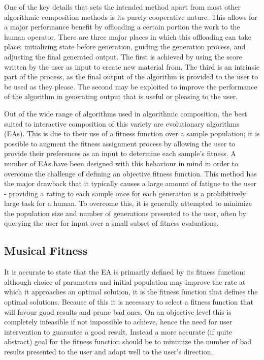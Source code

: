 \documentclass[ author={Stephen Livermore-Tozer},
				supervisor={Dr. Peter Flach},
				degree={MEng},
				title={Performing Algorithmic Co-composition Using Machine Learning},
				subtitle={},
				type={research},
				year={2016} ]{dissertation}
\begin{document}
	One of the key details that sets the intended method apart from most other algorithmic composition methods is its purely cooperative nature. This allows for a major performance benefit by offloading a certain portion the work to the human operator. There are three major places in which this offloading can take place: initializing state before generation, guiding the generation process, and adjusting the final generated output. The first is achieved by using the score written by the user as input to create new material from. The third is an intrinsic part of the process, as the final output of the algorithm is provided to the user to be used as they please. The second may be exploited to improve the performance of the algorithm in generating output that is useful or pleasing to the user.
	
	Out of the wide range of algorithms used in algorithmic composition, the best suited to interactive composition of this variety are evolutionary algorithms (EAs). This is due to their use of a fitness function over a sample population; it is possible to augment the fitness assignment process by allowing the user to provide their preferences as an input to determine each sample's fitness. A number of EAs have been designed with this behaviour in mind in order to overcome the challenge of defining an objective fitness function. This method has the major drawback that it typically causes a large amount of fatigue to the user - providing a rating to each sample once for each generation is a prohibitively large task for a human. To overcome this, it is generally attempted to minimize the population size and number of generations presented to the user, often by querying the user for input over a small subset of fitness evaluations. 
	
	\subsection{Musical Fitness}
	\label{sec:fitness}
	
	It is accurate to state that the EA is primarily defined by its fitness function: although choice of parameters and initial population may improve the rate at which it approaches an optimal solution, it is the fitness function that defines the optimal solutions. Because of this it is necessary to select a fitness function that will favour good results and prune bad ones. On an objective level this is completely infeasible if not impossible to achieve, hence the need for user intervention to guarantee a good result. Instead a more accurate (if quite abstract) goal for the fitness function should be to minimize the number of bad results presented to the user and adapt well to the user's direction. 
	
\end{document}
